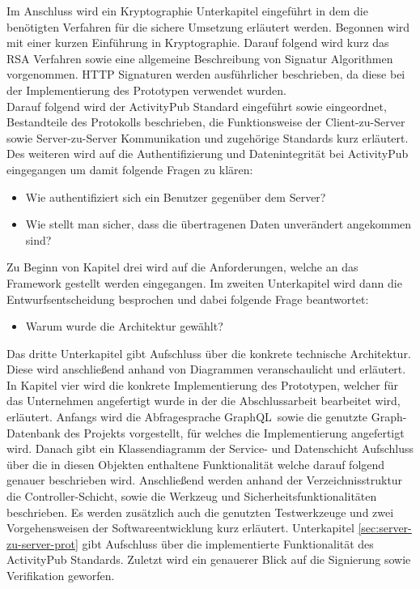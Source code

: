 	Im Anschluss wird ein Kryptographie Unterkapitel eingeführt in dem die benötigten Verfahren für die sichere Umsetzung erläutert werden. Begonnen wird mit einer kurzen Einführung in Kryptographie. Darauf folgend wird kurz das RSA Verfahren sowie eine allgemeine Beschreibung von Signatur Algorithmen vorgenommen. HTTP Signaturen werden ausführlicher beschrieben, da diese bei der Implementierung des Prototypen verwendet wurden.\\ 
	
	Darauf folgend wird der ActivityPub Standard eingeführt sowie eingeordnet, Bestandteile des Protokolls beschrieben, die Funktionsweise der Client-zu-Server sowie Server-zu-Server Kommunikation und zugehörige Standards kurz erläutert. Des weiteren wird auf die Authentifizierung und Datenintegrität bei ActivityPub eingegangen um damit folgende Fragen zu klären:
	\begin{itemize}
		\item Wie authentifiziert sich ein Benutzer gegenüber dem Server?
		\item Wie stellt man sicher, dass die übertragenen Daten unverändert angekommen sind?
	\end{itemize}
	Zu Beginn von Kapitel drei wird auf die Anforderungen, welche an das Framework gestellt werden eingegangen. Im zweiten Unterkapitel wird dann die Entwurfsentscheidung besprochen und dabei folgende Frage beantwortet:
	\begin{itemize}
		\item Warum wurde die Architektur gewählt?
	\end{itemize}
	Das dritte Unterkapitel gibt Aufschluss über die konkrete technische Architektur. Diese wird anschließend anhand von Diagrammen veranschaulicht und erläutert.\\
	
	In Kapitel vier wird die konkrete Implementierung des Prototypen, welcher für das Unternehmen angefertigt wurde in der die Abschlussarbeit bearbeitet wird, erläutert. Anfangs wird die Abfragesprache \glqq GraphQL\grqq~sowie die genutzte Graph-Datenbank des Projekts vorgestellt, für welches die Implementierung angefertigt wird. Danach gibt ein Klassendiagramm der Service- und Datenschicht Aufschluss über die in diesen Objekten enthaltene Funktionalität welche darauf folgend genauer beschrieben wird. Anschließend werden anhand der Verzeichnisstruktur die Controller-Schicht, sowie die Werkzeug und Sicherheitsfunktionalitäten beschrieben. Es werden zusätzlich auch die genutzten Testwerkzeuge und zwei Vorgehensweisen der Softwareentwicklung kurz erläutert. Unterkapitel \ref{sec:server-zu-server-prot} gibt Aufschluss über die implementierte Funktionalität des ActivityPub Standards. Zuletzt wird ein genauerer Blick auf die Signierung sowie Verifikation geworfen.\\
	
